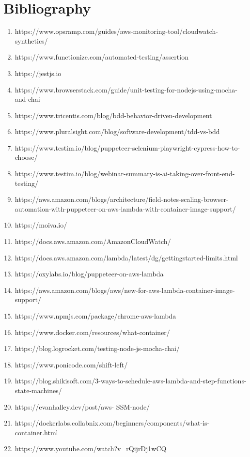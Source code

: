 \documentclass[12pt,a4paper,titlepage]{report}
\begin{document}
\chapter{Bibliography}
\begin{enumerate}
\item https://www.opsramp.com/guides/aws-monitoring-tool/cloudwatch-synthetics/
\item https://www.functionize.com/automated-testing/assertion
\item https://jestjs.io
\item https://www.browserstack.com/guide/unit-testing-for-nodejs-using-mocha-and-chai
\item https://www.tricentis.com/blog/bdd-behavior-driven-development
\item https://www.pluralsight.com/blog/software-development/tdd-vs-bdd
\item https://www.testim.io/blog/puppeteer-selenium-playwright-cypress-how-to-choose/
\item https://www.testim.io/blog/webinar-summary-is-ai-taking-over-front-end-testing/
\item https://aws.amazon.com/blogs/architecture/field-notes-scaling-browser-automation-with-puppeteer-on-aws-lambda-with-container-image-support/
\item https://moiva.io/
\item https://docs.aws.amazon.com/AmazonCloudWatch/
\item https://docs.aws.amazon.com/lambda/latest/dg/gettingstarted-limits.html
\item https://oxylabs.io/blog/puppeteer-on-aws-lambda
\item https://aws.amazon.com/blogs/aws/new-for-aws-lambda-container-image-support/
\item https://www.npmjs.com/package/chrome-aws-lambda
\item https://www.docker.com/resources/what-container/
\item https://blog.logrocket.com/testing-node-js-mocha-chai/
\item https://www.ponicode.com/shift-left/
\item https://blog.shikisoft.com/3-ways-to-schedule-aws-lambda-and-step-functions-state-machines/
\item https://evanhalley.dev/post/aws- SSM-node/
\item https://dockerlabs.collabnix.com/beginners/components/what-is-container.html
\item https://www.youtube.com/watch?v=rQijrDj1wCQ
\end{enumerate}
\end{document}
